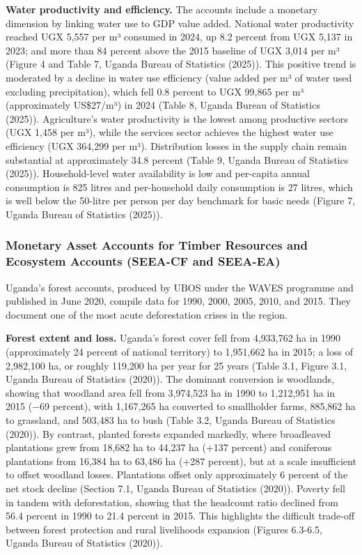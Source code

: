 \documentclass[
  letterpaper,
  DIV=11,
  numbers=noendperiod]{scrartcl}
\begin{document}
\textbf{Water productivity and efficiency.} The accounts include a
monetary dimension by linking water use to GDP value added. National
water productivity reached UGX 5,557 per m³ consumed in 2024, up 8.2
percent from UGX 5,137 in 2023; and more than 84 percent above the 2015
baseline of UGX 3,014 per m³ (Figure 4 and Table 7, Uganda Bureau of
Statistics (2025)). This positive trend is moderated by a decline in
water use efficiency (value added per m³ of water used excluding
precipitation), which fell 0.8 percent to UGX 99,865 per m³
(approximately US\$27/m³) in 2024 (Table 8, Uganda Bureau of Statistics
(2025)). Agriculture's water productivity is the lowest among productive
sectors (UGX 1,458 per m³), while the services sector achieves the
highest water use efficiency (UGX 364,299 per m³). Distribution losses
in the supply chain remain substantial at approximately 34.8 percent
(Table 9, Uganda Bureau of Statistics (2025)). Household-level water
availability is low and per-capita annual consumption is 825 litres and
per-household daily consumption is 27 litres, which is well below the
50-litre per person per day benchmark for basic needs (Figure 7, Uganda
Bureau of Statistics (2025)).

\subsubsection{Monetary Asset Accounts for Timber Resources and
Ecosystem Accounts (SEEA-CF and
SEEA-EA)}\label{monetary-asset-accounts-for-timber-resources-and-ecosystem-accounts-seea-cf-and-seea-ea}

Uganda's forest accounts, produced by UBOS under the WAVES programme and
published in June 2020, compile data for 1990, 2000, 2005, 2010, and
2015. They document one of the most acute deforestation crises in the
region.

\textbf{Forest extent and loss.} Uganda's forest cover fell from
4,933,762 ha in 1990 (approximately 24 percent of national territory) to
1,951,662 ha in 2015; a loss of 2,982,100 ha, or roughly 119,200 ha per
year for 25 years (Table 3.1, Figure 3.1, Uganda Bureau of Statistics
(2020)). The dominant conversion is woodlands, showing that woodland
area fell from 3,974,523 ha in 1990 to 1,212,951 ha in 2015 (−69
percent), with 1,167,265 ha converted to smallholder farms, 885,862 ha
to grassland, and 503,483 ha to bush (Table 3.2, Uganda Bureau of
Statistics (2020)). By contrast, planted forests expanded markedly,
where broadleaved plantations grew from 18,682 ha to 44,237 ha (+137
percent) and coniferous plantations from 16,384 ha to 63,486 ha (+287
percent), but at a scale insufficient to offset woodland losses.
Plantations offset only approximately 6 percent of the net stock decline
(Section 7.1, Uganda Bureau of Statistics (2020)). Poverty fell in
tandem with deforestation, showing that the headcount ratio declined
from 56.4 percent in 1990 to 21.4 percent in 2015. This highlights the
difficult trade-off between forest protection and rural livelihoods
expansion (Figures 6.3-6.5, Uganda Bureau of Statistics (2020)).
\end{document}
